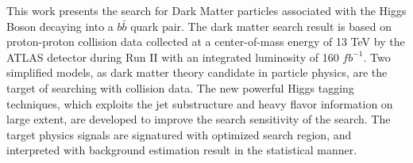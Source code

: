 This work presents the search for Dark Matter particles associated with the Higgs Boson decaying into a $b\bar{b}$ quark pair. 
The dark matter search result is based on proton-proton collision data collected at a center-of-mass energy of 13 TeV by the ATLAS detector during Run II with an integrated luminosity of 160 $fb^{-1}$. 
Two simplified models, as dark matter theory candidate in particle physics, are the target of searching with collision data. 
The new powerful Higgs tagging techniques, which exploits the jet substructure and heavy flavor information on large extent, are developed to improve the search sensitivity of the search. 
The target physics signals are signatured with optimized search region, and interpreted with background estimation result in the statistical manner.
